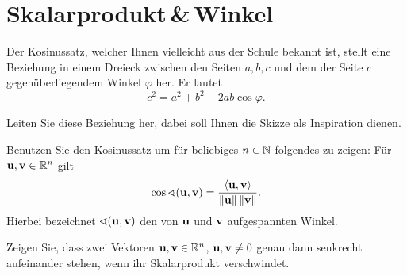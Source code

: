 \documentclass{scrartcl}
\newcommand{\uu}{\mat u}
\newcommand{\vv}{\mat v}
\begin{document}
\section{Skalarprodukt\,\&\,Winkel }
Der Kosinussatz, welcher Ihnen vielleicht aus der Schule bekannt ist, stellt eine Beziehung in einem Dreieck zwischen den Seiten $a,b,c$ und dem der Seite $c$ gegenüberliegendem Winkel $\varphi$ her.
Er lautet
  \[
  c^2=a^2+b^2-2ab\cos \varphi.
  \]
\begin{subex}
  \item{} Leiten Sie diese Beziehung her, dabei soll Ihnen die Skizze als Inspiration dienen.
  \item{} Benutzen Sie den Kosinussatz um für beliebiges $n \in \mathbb{N}$ folgendes zu zeigen: Für $\uu, \vv \in \RR^n$ gilt
  \[
    \cos \sphericalangle(\uu,\vv) = \frac{\sp{\uu}{\vv}}{\norm{\uu}\norm{\vv}}.
  \] 
  Hierbei bezeichnet $\sphericalangle(\uu,\vv)$ den von $\uu$ und $\vv$ aufgespannten Winkel.
  \item{} Zeigen Sie, dass zwei Vektoren $\uu, \vv \in \RR^n$, $\uu, \vv \neq 0$ genau dann senkrecht aufeinander stehen, wenn ihr Skalarprodukt verschwindet.
\end{subex}


\vspace{1em}
\begin{center}
\end{center}



 
\end{document}
